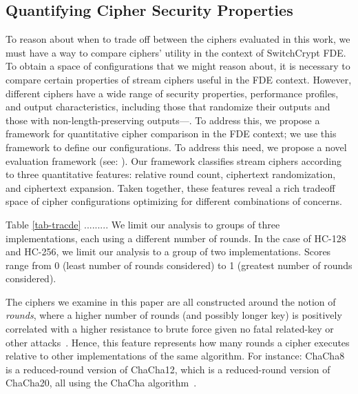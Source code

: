 

\subsection{Quantifying Cipher Security Properties} \label{subsec:quantify}




To reason about when to trade off between the ciphers evaluated in this work, we
must have a way to compare ciphers' utility in the context of SwitchCrypt FDE.
To obtain a space of configurations that we might reason about, it is
necessary to compare certain properties of stream ciphers useful in the
FDE context. However, different ciphers have a wide range of security
properties, performance profiles, and output characteristics, including
those that randomize their outputs and those with non-length-preserving
outputs---. To address
this, we propose a framework for quantitative cipher comparison in the FDE
context; we use this framework to define our configurations.
To address this need, we propose a novel
evaluation framework (see: ). Our framework classifies
stream ciphers according to three quantitative features: relative round count,
ciphertext randomization, and ciphertext expansion. Taken together, these
features reveal a rich tradeoff space of cipher configurations optimizing for
different combinations of concerns.


Table \ref{tab-tracde} .........
We limit our analysis to groups of three implementations, each using a different
number of rounds. In the case of HC-128 and HC-256, we limit our analysis to a
group of two implementations. Scores range from 0 (least number of rounds
considered) to 1 (greatest number of rounds considered).



The ciphers we examine in this paper are all constructed around the notion of
\emph{rounds}, where a higher number of rounds (and possibly longer key) is
positively correlated with a higher resistance to brute force given no fatal
related-key or other attacks~\cite{ChaCha-Cryptanalysis}. Hence, this feature
represents how many rounds a cipher executes relative to other implementations
of the same algorithm. For instance: ChaCha8 is a reduced-round version of
ChaCha12, which is a reduced-round version of ChaCha20, all using the ChaCha
algorithm~\cite{ChaCha20,ChaCha-Cryptanalysis}.


